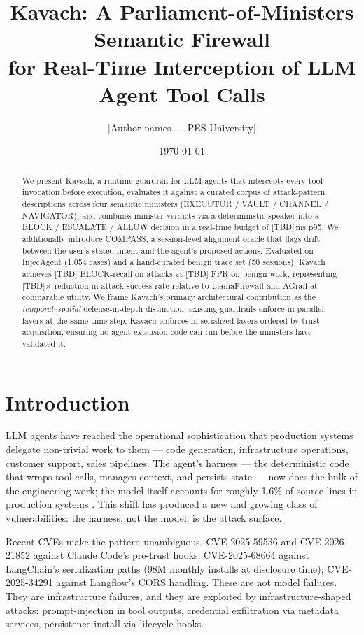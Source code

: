 \documentclass[11pt]{article}
\title{Kavach: A Parliament-of-Ministers Semantic Firewall \\
       for Real-Time Interception of LLM Agent Tool Calls}
\author{[Author names — PES University]}
\date{\today}
\begin{document}
\maketitle

\begin{abstract}
We present Kavach, a runtime guardrail for LLM agents that intercepts every
tool invocation before execution, evaluates it against a curated corpus of
attack-pattern descriptions across four semantic ministers
(EXECUTOR / VAULT / CHANNEL / NAVIGATOR), and combines minister verdicts via
a deterministic speaker into a BLOCK / ESCALATE / ALLOW decision in a
real-time budget of [TBD]\,ms p95. We additionally introduce COMPASS, a
session-level alignment oracle that flags drift between the user's stated
intent and the agent's proposed actions. Evaluated on InjecAgent
(1{,}054 cases) and a hand-curated benign trace set (50 sessions), Kavach
achieves [TBD] BLOCK-recall on attacks at [TBD] FPR on benign work,
representing [TBD]× reduction in attack success rate relative to
LlamaFirewall \cite{saxe2025llamafirewall} and AGrail
\cite{luo2025agrail} at comparable utility. We frame Kavach's primary
architectural contribution as the \emph{temporal--spatial} defense-in-depth
distinction: existing guardrails enforce in parallel layers at the same
time-step; Kavach enforces in serialized layers ordered by trust acquisition,
ensuring no agent extension code can run before the ministers have validated
it.
\end{abstract}

\section{Introduction}
\label{sec:intro}

LLM agents have reached the operational sophistication that production
systems delegate non-trivial work to them — code generation, infrastructure
operations, customer support, sales pipelines. The agent's harness — the
deterministic code that wraps tool calls, manages context, and persists state
— now does the bulk of the engineering work; the model itself accounts for
roughly 1.6\% of source lines in production systems
\cite{liu2026clawdesign}. This shift has produced a new and growing class of
vulnerabilities: the harness, not the model, is the attack surface.

Recent CVEs make the pattern unambiguous. CVE-2025-59536 and
CVE-2026-21852 against Claude Code's pre-trust hooks; CVE-2025-68664 against
LangChain's serialization paths (98M monthly installs at disclosure time);
CVE-2025-34291 against Langflow's CORS handling. These are not model
failures. They are infrastructure failures, and they are exploited by
infrastructure-shaped attacks: prompt-injection in tool outputs, credential
exfiltration via metadata services, persistence install via lifecycle hooks.
\end{document}
